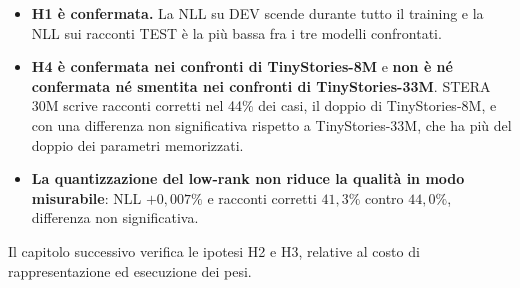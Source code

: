 \begin{itemize}
\item \textbf{H1 è confermata.} La NLL su DEV scende durante tutto il training e la NLL sui racconti TEST è la più bassa fra i tre modelli confrontati.
\item \textbf{H4 è confermata nei confronti di TinyStories-8M} e \textbf{non è né confermata né smentita nei confronti di TinyStories-33M}. STERA 30M scrive racconti corretti nel 44\% dei casi, il doppio di TinyStories-8M, e con una differenza non significativa rispetto a TinyStories-33M, che ha più del doppio dei parametri memorizzati.
\item \textbf{La quantizzazione del low-rank non riduce la qualità in modo misurabile}: NLL $+0{,}007\%$ e racconti corretti $41{,}3\%$ contro $44{,}0\%$, differenza non significativa.
\end{itemize}

Il capitolo successivo verifica le ipotesi H2 e H3, relative al costo di rappresentazione ed esecuzione dei pesi.
